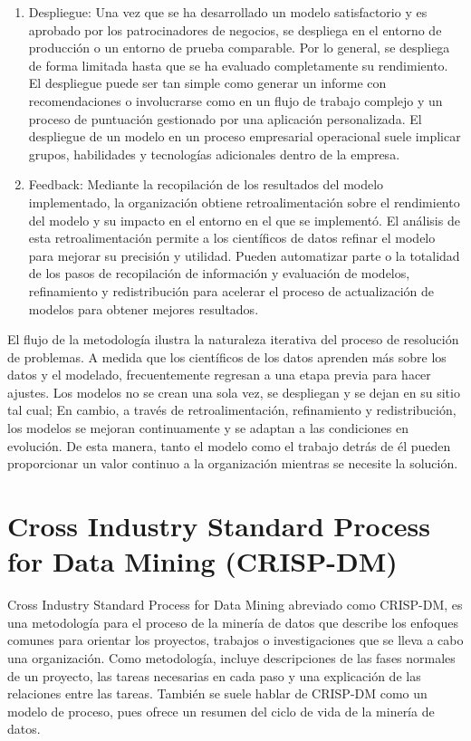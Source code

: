 \begin{enumerate}
\item Despliegue: Una vez que se ha desarrollado un modelo satisfactorio y es aprobado por los patrocinadores de negocios, se despliega en el entorno de producción o un entorno de prueba comparable. Por lo general, se despliega de forma limitada hasta que se ha evaluado completamente su rendimiento. El despliegue puede ser tan simple como generar un informe con recomendaciones o involucrarse como en un flujo de trabajo complejo y un proceso de puntuación gestionado por una aplicación personalizada. El despliegue de un modelo en un proceso empresarial operacional suele implicar grupos, habilidades y tecnologías adicionales dentro de la empresa.
\item Feedback: Mediante la recopilación de los resultados del modelo implementado, la organización obtiene retroalimentación sobre el rendimiento del modelo y su impacto en el entorno en el que se implementó. El análisis de esta retroalimentación permite a los científicos de datos refinar el modelo para mejorar su precisión y utilidad. Pueden automatizar parte o la totalidad de los pasos de recopilación de información y evaluación de modelos, refinamiento y redistribución para acelerar el proceso de actualización de modelos para obtener mejores resultados.
\end{enumerate}

El flujo de la metodología ilustra la naturaleza iterativa del proceso de resolución de problemas. A medida que los científicos de los datos aprenden más sobre los datos y el modelado, frecuentemente regresan a una etapa previa para hacer ajustes. Los modelos no se crean una sola vez, se despliegan y se dejan en su sitio tal cual; En cambio, a través de retroalimentación, refinamiento y redistribución, los modelos se mejoran continuamente y se adaptan a las condiciones en evolución. De esta manera, tanto el modelo como el trabajo detrás de él pueden proporcionar un valor continuo a la organización mientras se necesite la solución.\cite{ibmfmfds}


\section{Cross Industry Standard Process for Data Mining (CRISP-DM)}

Cross Industry Standard Process for Data Mining abreviado como CRISP-DM, es una metodología para el proceso de la minería de datos que describe los enfoques comunes para orientar los proyectos, trabajos o investigaciones que se lleva a cabo una organización. Como metodología, incluye descripciones de las fases normales de un proyecto, las tareas necesarias en cada paso y una explicación de las relaciones entre las tareas. También se suele hablar de CRISP-DM como un modelo de proceso, pues ofrece un resumen del ciclo de vida de la minería de datos.\\

